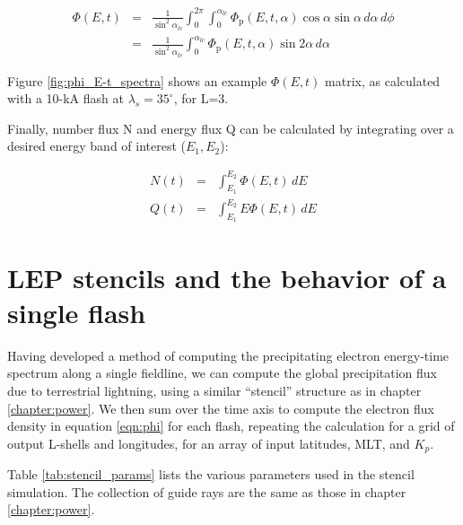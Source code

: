\begin{eqnarray}
\Phi(E,t)& = &\frac{1}{\sin^2\alpha_{lc}}\int_0^{2\pi}\int_0^{\alpha_{lc}}\Phi_\mathrm{p}(E,t,\alpha) \cos\alpha \sin\alpha\,d\alpha\,d\phi \\
&=& \frac{1}{\sin^2\alpha_{lc}} \int_0^{\alpha_{lc}}\Phi_\mathrm{p}(E,t,\alpha) \sin 2\alpha\,d\alpha
\label{eqn:phi}
\end{eqnarray}

Figure \ref{fig:phi_E-t_spectra} shows an example $\Phi(E,t)$ matrix, as calculated with a 10-kA flash at $\lambda_s=35^\circ$, for L=3.


Finally, number flux N and energy flux Q can be calculated by integrating over a desired energy band of interest ($E_1, E_2$):

\begin{eqnarray}
N(t) &=& \int_{E_1}^{E_2} \Phi(E,t)\,dE \\
Q(t) &=& \int_{E_1}^{E_2} E \Phi(E,t)\,dE
\end{eqnarray}



\section{LEP stencils and the behavior of a single flash}
\label{section:lep_stencils}
Having developed a method of computing the precipitating electron energy-time spectrum along a single fieldline, we can compute the global precipitation flux due to terrestrial lightning, using a similar ``stencil'' structure as in chapter \ref{chapter:power}. We then sum over the time axis to compute the electron flux density in equation \eqref{eqn:phi} for each flash, repeating the calculation for a grid of output L-shells and longitudes, for an array of input latitudes, MLT, and $K_p$.

Table \ref{tab:stencil_params} lists the various parameters used in the stencil simulation. The collection of guide rays are the same as those in chapter \ref{chapter:power}.


